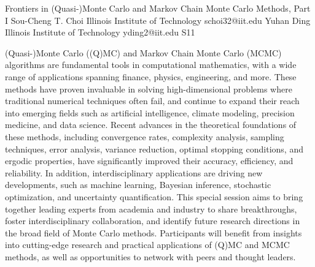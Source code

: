 \begin{session}
 {Frontiers in (Quasi-)Monte Carlo and Markov Chain Monte Carlo Methods, Part I}%
 {Sou-Cheng T. Choi}%
 {Illinois Institute of Technology}%
 {schoi32@iit.edu}%
 {Yuhan Ding}%
 {Illinois Institute of Technology}%
 {yding2@iit.edu}%
 {S11}%
{}

 (Quasi-)Monte Carlo ((Q)MC) and Markov Chain Monte Carlo (MCMC) algorithms are fundamental tools in computational mathematics, with a wide range of applications spanning finance, physics, engineering, and more. These methods have proven invaluable in solving high-dimensional problems where traditional numerical techniques often fail, and continue to expand their reach into emerging fields such as artificial intelligence, climate modeling, precision medicine, and data science.
 Recent advances in the theoretical foundations of these methods, including convergence rates, complexity analysis, sampling techniques, error analysis, variance reduction, optimal stopping conditions, and ergodic properties, have significantly improved their accuracy, efficiency, and reliability. In addition, interdisciplinary applications are driving new developments, such as machine learning, Bayesian inference, stochastic optimization, and uncertainty quantification.
 This special session aims to bring together leading experts from academia and industry to share breakthroughs, foster interdisciplinary collaboration, and identify future research directions in the broad field of Monte Carlo methods. Participants will benefit from insights into cutting-edge research and practical applications of (Q)MC and MCMC methods, as well as opportunities to network with peers and thought leaders.
\end{session}



\clearpage

